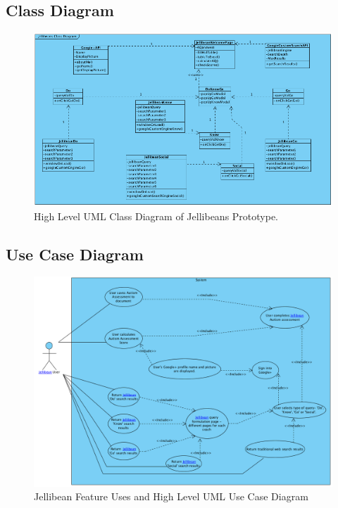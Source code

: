 \documentclass[a4paper, 11pt]{article}
\begin{document}
\subsection{Class Diagram}\label{jBeanClassDiagram}
\begin{figure}[H]
\begin{center}
\includegraphics[scale=0.55]{jBeanClassDiagram}
\caption{High Level UML Class Diagram of Jellibeans Prototype.}
\end{center}
\end{figure}

\newpage
\subsection{Use Case Diagram}\label{JBeanUseCaseA}

\begin{figure}[H]
\begin{center}
\includegraphics[scale=0.40]{JBeanUseCase}
\caption{Jellibean Feature Uses and High Level UML Use Case Diagram}
\label{JBeanUseCase}
\end{center}
\end{figure}
\end{document}
